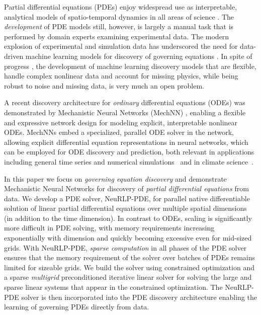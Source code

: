 Partial differential equations (PDEs) enjoy widespread use as interpretable, analytical models of spatio-temporal dynamics in all areas of science \cite{temam2024navier, turing1952chemical}.
The \emph{development} of PDE models still, however, is largely a manual task that is performed by domain experts examining experimental data.
The modern explosion of experimental and simulation data has underscored the need for data-driven machine learning models for discovery of governing equations \cite{brunton2020machine}. 
In spite of progress \cite{brunton2016discovering, raissi2019physics, dodeformer}, the development of machine learning discovery models that are flexible, handle complex nonlinear data and account for missing physics, while being robust to noise and missing data, is very much an open problem.

A recent discovery architecture for \emph{ordinary} differential equations (ODEs) was demonstrated by Mechanistic Neural Networks (MechNN) \cite{pervezmechanistic}, enabling a flexible and expressive network design for modeling explicit, interpretable nonlinear ODEs.
MechNNs embed a specialized, parallel ODE solver in the network, allowing explicit differential equation representations in neural networks, which can be employed for ODE discovery and prediction, both relevant in applications including general time series and numerical simulations~\cite{pervezmechanistic} and in climate science~\cite{chen2024scalable,yao2024marrying}.

In this paper we focus on \emph{governing equation discovery} and demonstrate Mechanistic Neural Networks for discovery of \emph{partial differential equations} from data.
We develop a PDE solver, NeuRLP-PDE, for parallel native differentiable solution of linear partial differential equations over multiple spatial dimensions (in addition to the time dimension). 
In contrast to ODEs, scaling is significantly more difficult in PDE solving, with memory requirements increasing exponentially with dimension and quickly becoming excessive even for mid-sized grids.
With NeuRLP-PDE, \emph{sparse computation} in all phases of the PDE solver ensures that the memory requirement of the solver over batches of PDEs remains limited for sizeable grids.
We build the solver using constrained optimization and a sparse \emph{multigrid} preconditioned iterative linear solver \cite{saad2003iterative} for solving the large and sparse linear systems that appear in the constrained optimization.
The NeuRLP-PDE solver is then incorporated into the PDE discovery architecture enabling the learning of governing PDEs directly from data.

